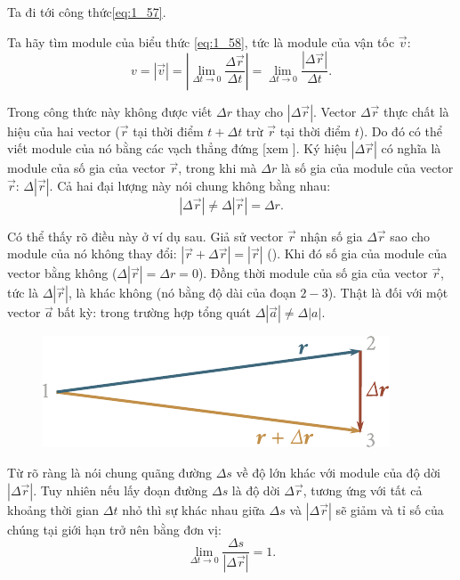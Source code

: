 \noindent
Ta đi tới công thức\eqref{eq:1_57}.

Ta hãy tìm module của biểu thức \eqref{eq:1_58}, tức là module của vận tốc $\vec{v}$:
\begin{equation}\label{eq:1_59}
v = |\vec{v}| = \left|\lim_{\Delta t\to 0} \frac{\Delta\vec{r}}{\Delta t}\right| = \lim_{\Delta t\to 0} \frac{|\Delta\vec{r}|}{\Delta t}.
\end{equation}

\noindent
Trong công thức này không được viết $\Delta r$ thay cho $|\Delta\vec{r}|$. Vector $\Delta\vec{r}$ thực chất là hiệu của hai vector ($\vec{r}$ tại thời điểm $t+\Delta t$ trừ $\vec{r}$ tại thời điểm $t$). Do đó có thể viết module của nó bằng các vạch thẳng đứng [xem ]. Ký hiệu $|\Delta\vec{r}|$ có nghĩa là module của số gia của vector $\vec{r}$, trong khi mà $\Delta r$ là số gia của module của vector $\vec{r}$: $\Delta|\vec{r}|$. Cả hai đại lượng này nói chung không bằng nhau:
\begin{equation*}
|\Delta\vec{r}| \neq \Delta|\vec{r}| = \Delta r.
\end{equation*}

\noindent
Có thể thấy rõ điều này ở ví dụ sau. Giả sử vector $\vec{r}$ nhận số gia $\Delta\vec{r}$ sao cho module của nó không thay đổi: $|\vec{r}+\Delta\vec{r}|=|\vec{r}|$ (). Khi đó số gia của module của vector bằng không ($\Delta|\vec{r}| = \Delta r = 0$). Đồng thời module của số gia của vector $\vec{r}$, tức là $\Delta|\vec{r}|$, là khác không (nó bằng độ dài của đoạn $2-3$). Thật là đối với một vector $\vec{a}$ bất kỳ: trong trường hợp tổng quát $\Delta|\vec{a}|\neq\Delta|a|$.

\begin{figure}[!htb]
	\begin{center}
		\includegraphics[scale=0.9]{figures/ch_01/fig_1_24.pdf}
		\caption[]{}
		\label{fig:1_24}
	\end{center}
\end{figure}

Từ  rõ ràng là nói chung quãng đường $\Delta s$ về độ lớn khác với module của độ dời $|\Delta\vec{r}|$. Tuy nhiên nếu lấy đoạn đường $\Delta s$ là độ dời $\Delta\vec{r}$, tương ứng với tất cả khoảng thời gian $\Delta t$ nhỏ thì sự khác nhau giữa $\Delta s$ và $|\Delta\vec{r}|$ sẽ giảm và tỉ số của chúng tại giới hạn trở nên bằng đơn vị:
\begin{equation*}
\lim_{\Delta t\to 0} \frac{\Delta s}{|\Delta\vec{r}|} = 1.
\end{equation*}

